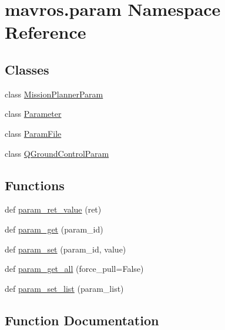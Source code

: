 \hypertarget{namespacemavros_1_1param}{}\section{mavros.\+param Namespace Reference}
\label{namespacemavros_1_1param}
\subsection*{Classes}
\begin{DoxyCompactItemize}
\item 
class \mbox{\hyperlink{classmavros_1_1param_1_1MissionPlannerParam}{Mission\+Planner\+Param}}
\item 
class \mbox{\hyperlink{classmavros_1_1param_1_1Parameter}{Parameter}}
\item 
class \mbox{\hyperlink{classmavros_1_1param_1_1ParamFile}{Param\+File}}
\item 
class \mbox{\hyperlink{classmavros_1_1param_1_1QGroundControlParam}{Q\+Ground\+Control\+Param}}
\end{DoxyCompactItemize}
\subsection*{Functions}
\begin{DoxyCompactItemize}
\item 
def \mbox{\hyperlink{namespacemavros_1_1param_a47a4fed2cd6c71f24fff0571bbb126f2}{param\+\_\+ret\+\_\+value}} (ret)
\item 
def \mbox{\hyperlink{namespacemavros_1_1param_aebfdc7b8de54a52cfe26ec8a6197e485}{param\+\_\+get}} (param\+\_\+id)
\item 
def \mbox{\hyperlink{namespacemavros_1_1param_a3f39b84fd5b9c353aac72b8a3fa17eff}{param\+\_\+set}} (param\+\_\+id, value)
\item 
def \mbox{\hyperlink{namespacemavros_1_1param_a77546eca26e806461988d639c318bae2}{param\+\_\+get\+\_\+all}} (force\+\_\+pull=False)
\item 
def \mbox{\hyperlink{namespacemavros_1_1param_a576f9e71fa66d8488b4c4f78554795b7}{param\+\_\+set\+\_\+list}} (param\+\_\+list)
\end{DoxyCompactItemize}


\subsection{Function Documentation}
\mbox{\label{namespacemavros_1_1param_aebfdc7b8de54a52cfe26ec8a6197e485}} 
